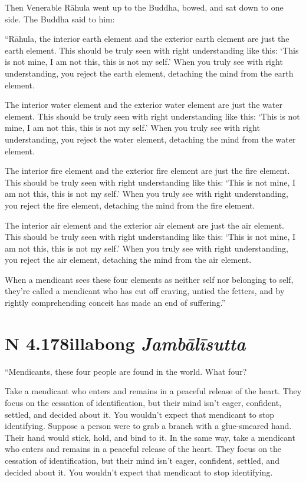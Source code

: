 \documentclass[12pt,openany]{book}%
\newcommand*{\suttatitleacronym}[1]{\smaller[2]{#1}\vspace*{.3em}}
\newcommand*{\suttatitletranslation}[1]{\linebreak{#1}}
\newcommand*{\suttatitleroot}[1]{\linebreak\smaller[2]\itshape{#1}}
\newcommand*{\tocacronym}[1]{\hspace*{-3.3em}{#1}\quad}
\newcommand*{\toctranslation}[1]{#1}
\newcommand*{\tocroot}[1]{(\textit{#1})}
\begin{document}
Then Venerable \textsanskrit{Rāhula} went up to the Buddha, bowed, and sat down to one side. The Buddha said to him: 

“\textsanskrit{Rāhula}, the interior earth element and the exterior earth element are just the earth element. This should be truly seen with right understanding like this: ‘This is not mine, I am not this, this is not my self.’ When you truly see with right understanding, you reject the earth element, detaching the mind from the earth element. 

The interior water element and the exterior water element are just the water element. This should be truly seen with right understanding like this: ‘This is not mine, I am not this, this is not my self.’ When you truly see with right understanding, you reject the water element, detaching the mind from the water element. 

The interior fire element and the exterior fire element are just the fire element. This should be truly seen with right understanding like this: ‘This is not mine, I am not this, this is not my self.’ When you truly see with right understanding, you reject the fire element, detaching the mind from the fire element. 

The interior air element and the exterior air element are just the air element. This should be truly seen with right understanding like this: ‘This is not mine, I am not this, this is not my self.’ When you truly see with right understanding, you reject the air element, detaching the mind from the air element. 

When a mendicant sees these four elements as neither self nor belonging to self, they’re called a mendicant who has cut off craving, untied the fetters, and by rightly comprehending conceit has made an end of suffering.” 

%
\section*{{\suttatitleacronym AN 4.178}{\suttatitletranslation Billabong }{\suttatitleroot Jambālīsutta}}
\addcontentsline{toc}{section}{\tocacronym{AN 4.178} \toctranslation{Billabong } \tocroot{Jambālīsutta}}

“Mendicants, these four people are found in the world. What four? 

Take a mendicant who enters and remains in a peaceful release of the heart. They focus on the cessation of identification, but their mind isn’t eager, confident, settled, and decided about it. You wouldn’t expect that mendicant to stop identifying. Suppose a person were to grab a branch with a glue-smeared hand. Their hand would stick, hold, and bind to it. In the same way, take a mendicant who enters and remains in a peaceful release of the heart. They focus on the cessation of identification, but their mind isn’t eager, confident, settled, and decided about it. You wouldn’t expect that mendicant to stop identifying. 
\end{document}
